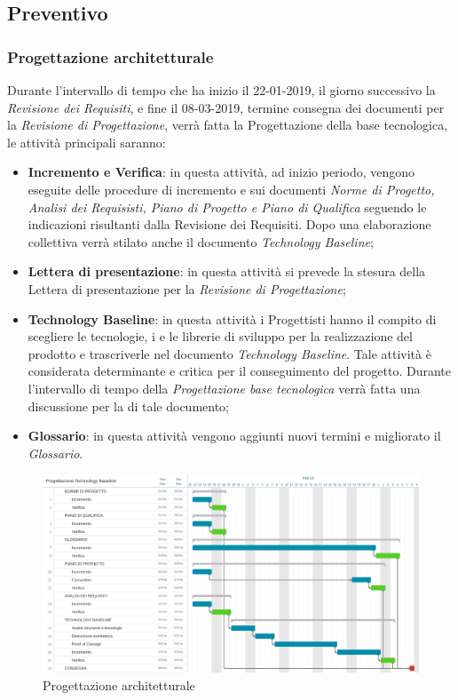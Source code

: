 \clearpage
\subsection{Preventivo}
\subsubsection{Progettazione architetturale}
Durante l'intervallo di tempo che ha inizio il 22-01-2019, il giorno successivo la \emph{Revisione dei Requisiti}, e fine il 08-03-2019, termine consegna dei documenti per la \emph{Revisione di Progettazione}, verrà fatta la Progettazione della base tecnologica, le attività principali saranno:
	\begin{itemize}
		\item \textbf{Incremento e Verifica}: in questa attività, ad inizio periodo, vengono eseguite delle procedure di incremento e  sui documenti \emph{Norme di Progetto, Analisi dei Requisisti, Piano di Progetto e Piano di Qualifica} seguendo le indicazioni risultanti dalla Revisione dei Requisiti. Dopo una elaborazione collettiva verrà stilato anche il documento \emph{Technology Baseline};
		\item \textbf{Lettera di presentazione}: in questa attività si prevede la stesura della Lettera di presentazione per la \emph{Revisione di Progettazione};
		\item \textbf{Technology Baseline}: in questa attività i Progettisti hanno il compito di scegliere le tecnologie, i  e le librerie di sviluppo per la realizzazione del prodotto e trascriverle nel documento \emph{Technology Baseline}. Tale attività è considerata determinante e critica per il conseguimento del progetto. Durante l'intervallo di tempo della \emph{Progettazione base tecnologica} verrà fatta una discussione per la \emph{} di tale documento;		
		\item \textbf{Glossario}: in questa attività vengono aggiunti nuovi termini e migliorato il \emph{Glossario}.
	\end{itemize}
\begin{figure}[htbp]
	\centering
	\includegraphics[width=15cm,keepaspectratio]{../includes/pics/grafici/Gantt_progettazione_technology_baseline.jpeg}
	\caption{\label{fig:mission} Progettazione architetturale}
\end{figure}

